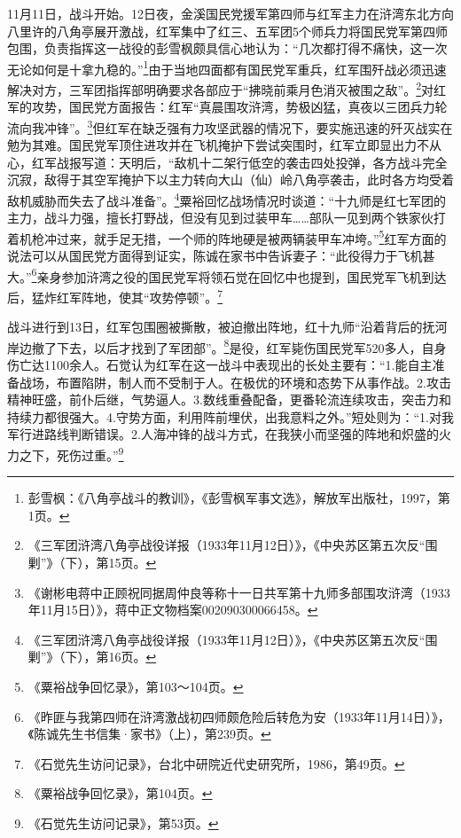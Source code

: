 11月11日，战斗开始。12日夜，金溪国民党援军第四师与红军主力在浒湾东北方向八里许的八角亭展开激战，红军集中了红三、五军团5个师兵力将国民党军第四师包围，负责指挥这一战役的彭雪枫颇具信心地认为：“几次都打得不痛快，这一次无论如何是十拿九稳的。”\footnote{彭雪枫：《八角亭战斗的教训》，《彭雪枫军事文选》，解放军出版社，1997，第1页。}由于当地四面都有国民党军重兵，红军围歼战必须迅速解决对方，三军团指挥部明确要求各部应于“拂晓前乘月色消灭被围之敌”。\footnote{《三军团浒湾八角亭战役详报（1933年11月12日）》，《中央苏区第五次反“围剿”》（下），第15页。}对红军的攻势，国民党方面报告：红军“真晨围攻浒湾，势极凶猛，真夜以三团兵力轮流向我冲锋”。\footnote{《谢彬电蒋中正顾祝同据周仲良等称十一日共军第十九师多部围攻浒湾（1933年11月15日）》，蒋中正文物档案002090300066458。}但红军在缺乏强有力攻坚武器的情况下，要实施迅速的歼灭战实在勉为其难。国民党军顶住进攻并在飞机掩护下尝试突围时，红军立即显出力不从心，红军战报写道：天明后，“敌机十二架行低空的袭击四处投弹，各方战斗完全沉寂，敌得于其空军掩护下以主力转向大山（仙）岭八角亭袭击，此时各方均受着敌机威胁而失去了战斗准备”。\footnote{《三军团浒湾八角亭战役详报（1933年11月12日）》，《中央苏区第五次反“围剿”》（下），第16页。}粟裕回忆战场情况时谈道：“十九师是红七军团的主力，战斗力强，擅长打野战，但没有见到过装甲车……部队一见到两个铁家伙打着机枪冲过来，就手足无措，一个师的阵地硬是被两辆装甲车冲垮。”\footnote{《粟裕战争回忆录》，第103～104页。}红军方面的说法可以从国民党方面得到证实，陈诚在家书中告诉妻子：“此役得力于飞机甚大。”\footnote{《昨匪与我第四师在浒湾激战初四师颇危险后转危为安（1933年11月14日）》，《陈诚先生书信集·家书》（上），第239页。}亲身参加浒湾之役的国民党军将领石觉在回忆中也提到，国民党军飞机到达后，猛炸红军阵地，使其“攻势停顿”。\footnote{《石觉先生访问记录》，台北中研院近代史研究所，1986，第49页。}


战斗进行到13日，红军包围圈被撕散，被迫撤出阵地，红十九师“沿着背后的抚河岸边撤了下去，以后才找到了军团部”。\footnote{《粟裕战争回忆录》，第104页。}是役，红军毙伤国民党军520多人，自身伤亡达1100余人。石觉认为红军在这一战斗中表现出的长处主要有：“1.能自主准备战场，布置陷阱，制人而不受制于人。在极优的环境和态势下从事作战。2.攻击精神旺盛，前仆后继，气势逼人。3.数线重叠配备，更番轮流连续攻击，突击力和持续力都很强大。4.守势方面，利用阵前埋伏，出我意料之外。”短处则为：“1.对我军行进路线判断错误。2.人海冲锋的战斗方式，在我狭小而坚强的阵地和炽盛的火力之下，死伤过重。”\footnote{《石觉先生访问记录》，第53页。}


